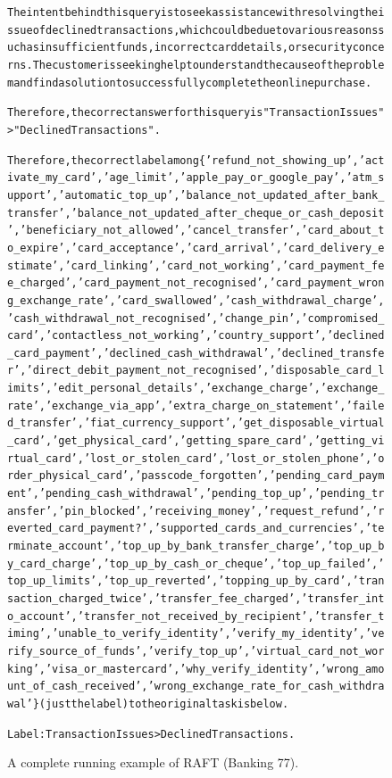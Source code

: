 \begin{figure}[t]
{{\begin{alltt}
The intent behind this query is to seek assistance with resolving the issue of declined transactions, which could be due to various reasons such as insufficient funds, incorrect card details, or security concerns. The customer is seeking help to understand the cause of the problem and find a solution to successfully complete the online purchase.

Therefore, the correct answer for this query is "Transaction Issues" > "Declined Transactions".

Therefore, the correct label among \{'refund\_not\_showing\_up', 'activate\_my\_card', 'age\_limit', 'apple\_pay\_or\_google\_pay', 'atm\_support', 'automatic\_top\_up', 'balance\_not\_updated\_after\_bank\_transfer', 'balance\_not\_updated\_after\_cheque\_or\_cash\_deposit', 'beneficiary\_not\_allowed', 'cancel\_transfer', 'card\_about\_to\_expire', 'card\_acceptance', 'card\_arrival', 'card\_delivery\_estimate', 'card\_linking', 'card\_not\_working', 'card\_payment\_fee\_charged', 'card\_payment\_not\_recognised', 'card\_payment\_wrong\_exchange\_rate', 'card\_swallowed', 'cash\_withdrawal\_charge', 'cash\_withdrawal\_not\_recognised', 'change\_pin', 'compromised\_card', 'contactless\_not\_working', 'country\_support', 'declined\_card\_payment', 'declined\_cash\_withdrawal', 'declined\_transfer', 'direct\_debit\_payment\_not\_recognised', 'disposable\_card\_limits', 'edit\_personal\_details', 'exchange\_charge', 'exchange\_rate', 'exchange\_via\_app', 'extra\_charge\_on\_statement', 'failed\_transfer', 'fiat\_currency\_support', 'get\_disposable\_virtual\_card', 'get\_physical\_card', 'getting\_spare\_card', 'getting\_virtual\_card', 'lost\_or\_stolen\_card', 'lost\_or\_stolen\_phone', 'order\_physical\_card', 'passcode\_forgotten', 'pending\_card\_payment', 'pending\_cash\_withdrawal', 'pending\_top\_up', 'pending\_transfer', 'pin\_blocked', 'receiving\_money', 'request\_refund', 'reverted\_card\_payment?', 'supported\_cards\_and\_currencies', 'terminate\_account', 'top\_up\_by\_bank\_transfer\_charge', 'top\_up\_by\_card\_charge', 'top\_up\_by\_cash\_or\_cheque', 'top\_up\_failed', 'top\_up\_limits', 'top\_up\_reverted', 'topping\_up\_by\_card', 'transaction\_charged\_twice', 'transfer\_fee\_charged', 'transfer\_into\_account', 'transfer\_not\_received\_by\_recipient', 'transfer\_timing', 'unable\_to\_verify\_identity', 'verify\_my\_identity', 'verify\_source\_of\_funds', 'verify\_top\_up', 'virtual\_card\_not\_working', 'visa\_or\_mastercard', 'why\_verify\_identity', 'wrong\_amount\_of\_cash\_received', 'wrong\_exchange\_rate\_for\_cash\_withdrawal'\} (just the label) to the original task is below.

Label: Transaction Issues > Declined Transactions.
\end{alltt}
}}
\caption{A complete running example of RAFT (Banking 77).}
\label{fig:raft_subset=banking_77_example}
\end{figure}
